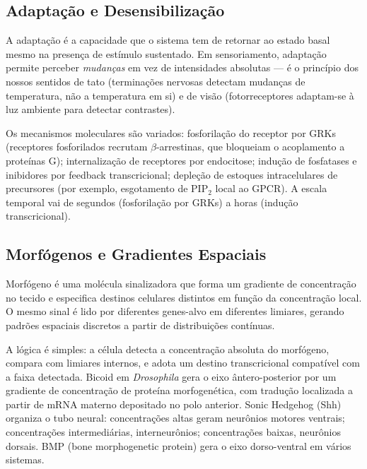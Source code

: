 \subsection{Adaptação e Desensibilização}
\label{sub:image9-adaptacao}

A adaptação é a capacidade que o sistema tem de retornar ao estado basal
mesmo na presença de estímulo sustentado. Em sensoriamento, adaptação
permite perceber \emph{mudanças} em vez de intensidades absolutas --- é o
princípio dos nossos sentidos de tato (terminações nervosas detectam
mudanças de temperatura, não a temperatura em si) e de visão (fotorreceptores
adaptam-se à luz ambiente para detectar contrastes).

Os mecanismos moleculares são variados: fosforilação do receptor por GRKs
(receptores fosforilados recrutam $\beta$-arrestinas, que bloqueiam o
acoplamento a proteínas G); internalização de receptores por endocitose;
indução de fosfatases e inibidores por feedback transcricional; depleção de
estoques intracelulares de precursores (por exemplo, esgotamento de PIP$_2$
local ao GPCR). A escala temporal vai de segundos (fosforilação por GRKs) a
horas (indução transcricional).

\subsection{Morfógenos e Gradientes Espaciais}
\label{sub:image9-morfogenos}

\begin{definicaoenv}[Morfógeno]
Morfógeno é uma molécula sinalizadora que forma um gradiente de concentração
no tecido e especifica destinos celulares distintos em função da concentração
local. O mesmo sinal é lido por diferentes genes-alvo em diferentes limiares,
gerando padrões espaciais discretos a partir de distribuições contínuas.
\end{definicaoenv}

A lógica é simples: a célula detecta a concentração absoluta do morfógeno,
compara com limiares internos, e adota um destino transcricional compatível
com a faixa detectada. Bicoid em \emph{Drosophila} gera o eixo ântero-posterior
por um gradiente de concentração de proteína morfogenética, com tradução
localizada a partir de mRNA materno depositado no polo anterior. Sonic
Hedgehog (Shh) organiza o tubo neural: concentrações altas geram neurônios
motores ventrais; concentrações intermediárias, interneurônios; concentrações
baixas, neurônios dorsais. BMP (bone morphogenetic protein) gera o eixo
dorso-ventral em vários sistemas.

